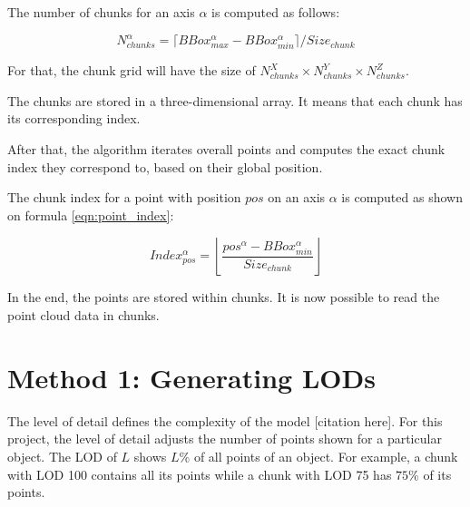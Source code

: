 The number of chunks for an axis $\alpha$ is computed as follows:

\begin{equation}
\label{eqn:n_chunks}
N_{chunks}^\alpha = \lceil BBox_{max}^\alpha - BBox_{min}^\alpha \rceil / Size_{chunk}
\end{equation}

For that, the chunk grid will have the size of $N_{chunks}^X \times N_{chunks}^Y \times N_{chunks}^Z$.

The chunks are stored in a three-dimensional array. It means that each chunk has its corresponding index.

After that, the algorithm iterates overall points and computes the exact chunk index they correspond to, based on their global position.

The chunk index for a point with position $pos$ on an axis $\alpha$ is computed as shown on formula \ref{eqn:point_index}:

\begin{equation}
\label{eqn:point_index}
Index_{pos}^\alpha = \left \lfloor \frac{pos^{\alpha} - BBox_{min}^\alpha}{Size_{chunk}} \right \rfloor
\end{equation}

In the end, the points are stored within chunks. It is now possible to read the point cloud data in chunks.


\section{Method 1: Generating LODs}
\label{sec:generating_lods}

The level of detail defines the complexity of the model [citation here]. For this project, the level of detail adjusts the number of points shown for a particular object.
The LOD of $L$ shows $L\%$ of all points of an object. For example, a chunk with LOD 100 contains all its points while a chunk with LOD 75 has $75\%$ of its points.


